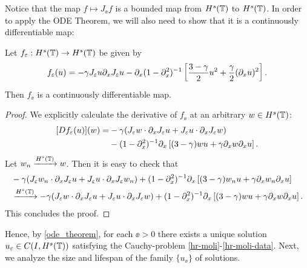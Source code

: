 %
%
Notice that the map $f \mapsto J_{\ee} f$ is a bounded map from $H^s(\mathbb{T})$
to $H^s(\mathbb{T})$.  In order to apply the ODE Theorem, we will also need to
show that it is a continuously differentiable map:
%
%
%
\begin{lemma}
Let $f_\varepsilon:H^s(\mathbb{T}) \to H^s(\mathbb{T})$ be given by 
\begin{equation}
\label{f_ep}
f_{\varepsilon}(u) = -\gamma  J_\varepsilon u \partial_x J_\varepsilon u
- \partial_x (1-\partial_x^2)^{-1} \left
[\frac{3-\gamma}{2}u^2 + \frac{\gamma}{2}(\partial_x u)^2 \right ].
\end{equation}
Then $f_\ee$  is a continuously differentiable map.
\end{lemma}
%
%
\begin{proof} We explicitly calculate the derivative of $f_\ee$ at an
arbitrary $w \in H^s(\mathbb{T})$:
\begin{equation*}
\begin{split}
[Df_{\varepsilon}(u)](w)
=
& -\gamma (J_\varepsilon w \cdot \partial_x J_\varepsilon u +
J_\varepsilon u \cdot \partial_x J_\varepsilon w)
\\
& - (1-\partial_x ^2)^{-1}
\partial_x \left [(3-\gamma)w u + \gamma\partial_x w \partial_x u \right ].
\end{split}
\end{equation*}
Let $w_n \xrightarrow{H^s(\mathbb{T})} w$. Then it is easy to check that
%
\begin{equation}
\begin{split}
& -\gamma (J_\varepsilon w_n \cdot \partial_x J_\varepsilon u 
+ J_\varepsilon u \cdot \partial_x J_\varepsilon w_n)
+ (1-\partial_x ^2)^{-1}
\partial_x \left [(3-\gamma)w_n u + \gamma\partial_x w_n \partial_x u \right ]
\\
& \xrightarrow{H^s(\mathbb{T})} 
-\gamma (J_\varepsilon w \cdot \partial_x J_\varepsilon u 
+ J_\varepsilon u \cdot \partial_x J_\varepsilon w) + (1-\partial_x ^2)^{-1}
\partial_x \left [(3-\gamma)w u + \gamma\partial_x w \partial_x u \right ].
\end{split}
\end{equation}
This concludes the proof. 
\end{proof}
Hence, by \cref{ode_theorem}, for each $\ee > 0$ there exists a
unique solution $u_\varepsilon \in C(I, H^s(\mathbb{T}))$ satisfying the Cauchy-problem
\eqref{hr-moli}-\eqref{hr-moli-data}. Next, we analyze the size and
lifespan of the family $\{u_\ee\}$ of solutions.
%
%
%
%

